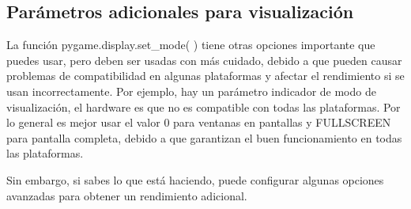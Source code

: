 

\subsection{Parámetros adicionales para visualización} \label{pantalla}  %



La función  {\ttfamily pygame.display.set\_mode( )} tiene otras opciones importante que  puedes usar,  pero deben ser usadas 
con más cuidado, debido a que pueden causar problemas de compatibilidad en algunas plataformas y afectar el rendimiento si se usan incorrectamente. Por ejemplo, hay un parámetro indicador de modo de visualización, el {\ttfamily hardware} es que no es  compatible con todas las plataformas. Por lo general es mejor usar el valor 0 para ventanas en  pantallas y  {\ttfamily FULLSCREEN} para pantalla completa, debido a que garantizan el buen funcionamiento en todas las plataformas.

Sin embargo, si sabes lo que está haciendo, puede configurar algunas opciones avanzadas para obtener un rendimiento adicional.\\

